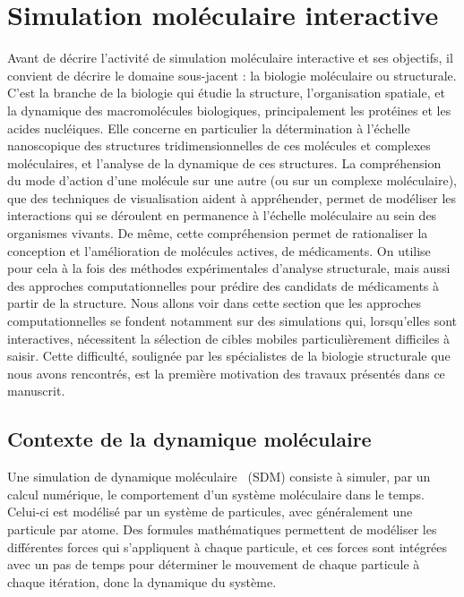 	\section{Simulation moléculaire interactive}
	Avant de décrire l'activité de simulation moléculaire interactive et ses objectifs, il convient de décrire le domaine sous-jacent : la biologie moléculaire ou structurale. C'est la branche de la biologie qui étudie la structure, l'organisation spatiale, et la dynamique des macromolécules biologiques, principalement les protéines et les acides nucléiques. Elle concerne en particulier la détermination à l'échelle nanoscopique des structures tridimensionnelles de ces molécules et complexes moléculaires, et l'analyse de la dynamique de ces structures. La compréhension du mode d'action d'une molécule sur une autre (ou sur un complexe moléculaire), que des techniques de visualisation aident à appréhender, permet de modéliser les interactions qui se déroulent en permanence à l'échelle moléculaire au sein des organismes vivants. De même, cette compréhension permet de rationaliser la conception et l'amélioration de molécules actives, de médicaments. On utilise pour cela à la fois des méthodes expérimentales d'analyse structurale, mais aussi des approches computationnelles pour prédire des candidats de médicaments à partir de la structure. Nous allons voir dans cette section que les approches computationnelles se fondent notamment sur des simulations qui, lorsqu'elles sont interactives, nécessitent la sélection de cibles mobiles particulièrement difficiles à saisir. Cette difficulté, soulignée par les spécialistes de la biologie structurale que nous avons rencontrés, est la première motivation des travaux présentés dans ce manuscrit.
	
	\subsection{Contexte de la dynamique moléculaire}
	Une simulation de dynamique moléculaire~\cite{fermi1955alamos, alder1959studies, rahman1964correlations, gibson1960dynamics, lennard1924determination} (SDM) consiste à simuler, par un calcul numérique, le comportement d'un système moléculaire dans le temps. Celui-ci est modélisé par un système de particules, avec généralement une particule par atome. Des formules mathématiques permettent de modéliser les différentes forces qui s'appliquent à chaque particule, et ces forces sont intégrées avec un pas de temps pour déterminer le mouvement de chaque particule à chaque itération, donc la dynamique du système.
	
